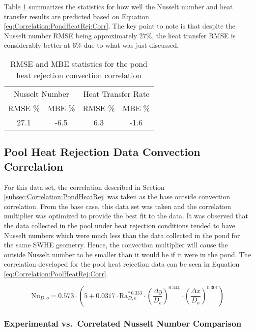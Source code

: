 Table \ref{tab:Correlation:PondHeatRej:StatSummaryTable} summarizes the statistics for how well the Nusselt number and heat transfer results are predicted based on Equation \ref{eq:Correlation:PondHeatRej:Corr}. The key point to note is that despite the Nusselt number RMSE being approximately 27\%, the heat transfer RMSE is considerably better at 6\% due to what was just discussed.

	\begin{table}[h]
		\centering
		\caption{RMSE and MBE statistics for the pond heat rejection convection correlation}
		\label{tab:Correlation:PondHeatRej:StatSummaryTable}
		\begin{tabular}{c c c c}
		\hline
		\multicolumn{2}{c}{Nusselt Number} & \multicolumn{2}{c}{Heat Transfer Rate} \\
		RMSE \% & MBE \% & RMSE \% & MBE \% \\
		\hline\hline
		27.1 & -6.5 & 6.3 & -1.6 \\
		\hline		
		\end{tabular}
	\end{table}
	
\subsection{Pool Heat Rejection Data Convection Correlation}
		
For this data set, the correlation described in Section \ref{subsec:Correlation:PondHeatRej} was taken as the base outside convection correlation. From the base case, this data set was taken and the correlation multiplier was optimized to provide the best fit to the data. It was observed that the data collected in the pool under heat rejection conditions tended to have Nusselt numbers which were much less than the data collected in the pond for the same SWHE geometry. Hence, the convection multiplier will cause the outside Nusselt number to be smaller than it would be if it were in the pond. The correlation developed for the pool heat rejection data can be seen in Equation \ref{eq:Correlation:PoolHeatRej:Corr}.

\begin{equation}
	\mbox{Nu}_{D,o} = 0.573 \cdot \left(5+ 0.0317 \cdot \mbox{Ra}_{D,o}^{* \, 0.333} \cdot \left(\frac{\Delta y}{D_o}\right)^{0.344} \cdot \left(\frac{\Delta x}{D_o}\right)^{0.301}\right)
	\label{eq:Correlation:PoolHeatRej:Corr}
\end{equation}


\subsubsection{Experimental vs.\ Correlated Nusselt Number Comparison}
			
